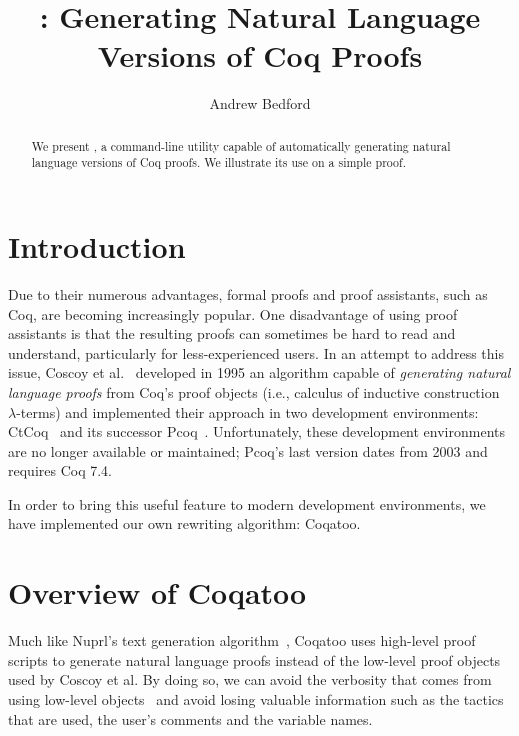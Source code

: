 \documentclass[sigplan,9pt]{acmart}\settopmatter{printfolios=true,printccs=false,printacmref=false}
\begin{document}
\title[Coqatoo]{\coqatoo: Generating Natural Language Versions of Coq Proofs}


\author{Andrew Bedford}


\begin{abstract}
  We present \coqatoo, a command-line utility capable of automatically generating natural language versions of Coq proofs. We illustrate its use on a simple proof.
\end{abstract}

\maketitle

\section{Introduction}
Due to their numerous advantages, formal proofs and proof assistants, such as Coq, are becoming increasingly popular. One disadvantage of using proof assistants is that the resulting proofs can sometimes be hard to read and understand, particularly for less-experienced users. In an attempt to address this issue, Coscoy et al.~\cite{DBLP:conf/tlca/CoscoyKT95} developed in 1995 an algorithm capable of \emph{generating natural language proofs} from Coq's proof objects (i.e., calculus of inductive construction $\lambda$-terms) and implemented their approach in two development environments: CtCoq~\cite{CtCoq} and its successor Pcoq~\cite{Pcoq}. Unfortunately, these development environments are no longer available or maintained; Pcoq's last version dates from 2003 and requires Coq 7.4.

In order to bring this useful feature to modern development environments, we have implemented our own rewriting algorithm: Coqatoo.


\section{Overview of Coqatoo}
Much like Nuprl's text generation algorithm~\cite{DBLP:conf/aaai/Holland-MinkleyBC99}, Coqatoo uses high-level proof scripts to generate natural language proofs instead of the low-level proof objects used by Coscoy et al. By doing so, we can avoid the verbosity that comes from using low-level objects~\cite{DBLP:conf/lacl/Coscoy96} and avoid losing valuable information such as the tactics that are used, the user's comments and the variable names. 
\end{document}
